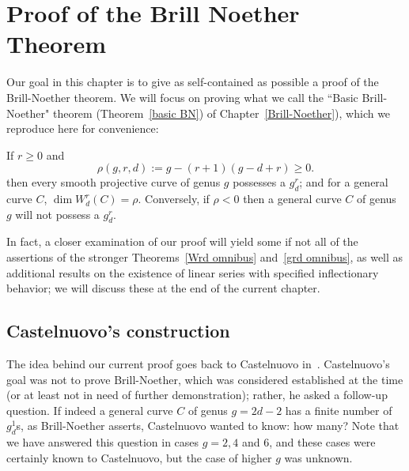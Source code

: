 

\chapter{Proof of the Brill Noether Theorem}\label{Brill Noether proof chapter}
\label{BrillNoetherproofChapter}

Our goal in this chapter is to give as self-contained as possible a proof of the Brill-Noether theorem. We will focus on proving what we call the ``Basic Brill-Noether" theorem (Theorem~\ref{basic BN}) of Chapter~\ref{Brill-Noether}), which we reproduce here for convenience:

\begin{theorem}
If $r\geq 0$ and
 $$
 \rho(g,r,d) := g - (r+1)(g-d+r) \geq 0.
$$
then every smooth projective curve of genus $g$  possesses a $g^r_d$; and for a general curve $C$,  $\dim W^r_d(C) = \rho$. Conversely, if $\rho < 0$ then a general curve $C$ of genus $g$ will not possess a $g^r_d$.
\end{theorem}

In fact, a closer examination of our proof will yield some if not all of the assertions of the stronger Theorems~\ref{Wrd omnibus} and~\ref{grd omnibus}, as well as additional results on the existence of linear series with specified inflectionary behavior; we will discuss these at the end of the current chapter.


\section{Castelnuovo's construction}

The idea behind our current proof goes back to Castelnuovo in~\cite{zbMATH02692307}. Castelnuovo's goal was not to prove Brill-Noether, which was considered established at the time (or at least not in need of further demonstration); rather, he asked a follow-up question. If indeed a general curve $C$ of genus $g = 2d-2$ has a finite number of $g^1_d$s, as Brill-Noether asserts, Castelnuovo wanted to know: how many? Note that we have answered this question in cases $g = 2, 4$ and 6, and these cases were certainly known to Castelnuovo, but the case of higher $g$ was unknown.

